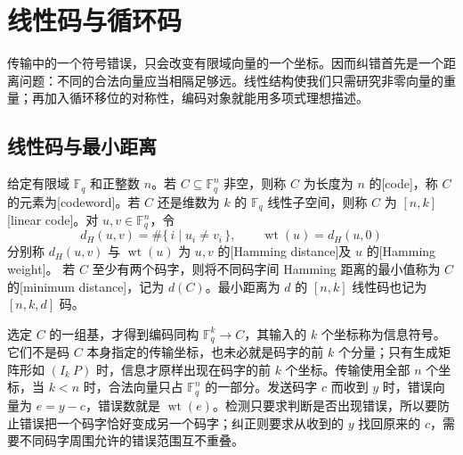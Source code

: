 
\section{线性码与循环码}
\label{b1:sec:B02}

传输中的一个符号错误，只会改变有限域向量的一个坐标。因而纠错首先是一个距离问题：不同的合法向量应当相隔足够远。线性结构使我们只需研究非零向量的重量；再加入循环移位的对称性，编码对象就能用多项式理想描述。

\subsection{线性码与最小距离}
\label{b1:subsec:B02:01}

\begin{definition}\label{b1:def:B-linear-code}
	给定有限域 \(\mathbb F_q\) 和正整数 \(n\)。若 \(C\subseteq\mathbb F_q^n\) 非空，则称 \(C\) 为长度为 \(n\) 的[code]，称 \(C\) 的元素为[codeword]。若 \(C\) 还是维数为 \(k\) 的 \(\mathbb F_q\) 线性子空间，则称 \(C\) 为 \([n,k]\) [linear code]。对 \(u,v\in\mathbb F_q^n\)，令
	\[
		d_H(u,v)=\#\{\,i\mid u_i\ne v_i\,\},\qquad \operatorname{wt}(u)=d_H(u,0)
	\]
	分别称 \(d_H(u,v)\) 与 \(\operatorname{wt}(u)\) 为 \(u,v\) 的[Hamming distance]及 \(u\) 的[Hamming weight]。 若 \(C\) 至少有两个码字，则将不同码字间 Hamming 距离的最小值称为 \(C\) 的[minimum distance]，记为 \(d(C)\)。最小距离为 \(d\) 的 \([n,k]\) 线性码也记为 \([n,k,d]\) 码。
\end{definition}


选定 \(C\) 的一组基，才得到编码同构 \(\mathbb F_q^k\rightarrow C\)，其输入的 \(k\) 个坐标称为信息符号。它们不是码 \(C\) 本身指定的传输坐标，也未必就是码字的前 \(k\) 个分量；只有生成矩阵形如 \((I_k\ P)\) 时，信息才原样出现在码字的前 \(k\) 个坐标。传输使用全部 \(n\) 个坐标，当 \(k<n\) 时，合法向量只占 \(\mathbb F_q^n\) 的一部分。发送码字 \(c\) 而收到 \(y\) 时，错误向量为 \(e=y-c\)，错误数就是 \(\operatorname{wt}(e)\)。检测只要求判断是否出现错误，所以要防止错误把一个码字恰好变成另一个码字；纠正则要求从收到的 \(y\) 找回原来的 \(c\)，需要不同码字周围允许的错误范围互不重叠。

